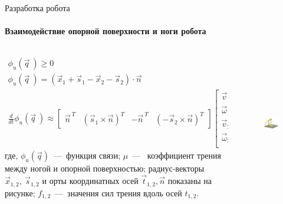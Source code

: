 \documentclass[aspectratio=169,xcolor=table]{beamer}
\begin{document}
\begin{frame}[t]{Разработка робота}
    \framesubtitle{Взаимодействие опорной поверхности и ноги робота}
    \vspace{-0.6cm}
    \begin{columns}[T,onlytextwidth]
        \begin{column}{0.69\textwidth}
            \begin{align*}
                \phi_u(\vec{q}\ ) \geqslant 0                                                     \\
                \phi_u(\vec{q}\ ) = (\vec{x}_1 + \vec{s}_1 - \vec{x}_2 - \vec{s}_2) \cdot \vec{n} \\
                \frac{d }{d t}\phi_u(\vec{q}\ ) \approx \begin{bmatrix}
                                                            \vec{n}^{\ T} & (\vec{s}_1 \times \vec{n})^T & -\vec{n}^{\ T} & (-\vec{s}_2 \times \vec{n})^T
                                                        \end{bmatrix} \begin{bmatrix}
                                                                          \vec{v}_1      \\
                                                                          \vec{\omega}_1 \\
                                                                          \vec{v}_2      \\
                                                                          \vec{\omega}_2 \\
                                                                      \end{bmatrix}
            \end{align*}
            где, $\phi_u(\vec{q})$~---~функция связи; $ \mu $~---~ коэффициент трения между ногой и опорной поверхностью;  радиус-векторы $\vec{x}_{1,2},\ \vec{s}_{1,2}$ и орты координатных осей $\vec{t}_{1,2}, \vec{n}$ показаны на рисунке; $ f_{1,2} $~---~значения сил трения вдоль осей $t_{1,2}$.
        \end{column}
        \begin{column}{0.29\textwidth}
            \vspace{-0.4cm}
            \begin{figure}[H]
                \centering\includegraphics[height=6cm,width=1\textwidth,keepaspectratio]{contact_interaction.png}

\end{figure}
\end{column}
\end{columns}
\end{frame}
\end{document}
